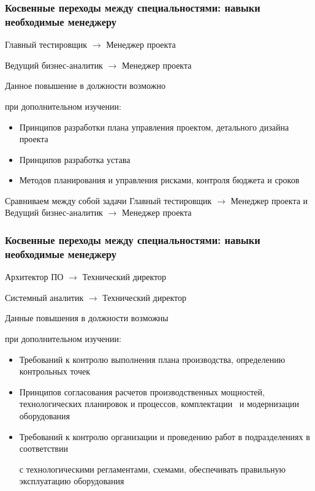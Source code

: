 \documentclass{../industrial-development}
\begin{document}
\begin{frame} \frametitle{Косвенные переходы между специальностями: навыки необходимые менеджеру}

\begin{block}{Главный тестировщик $\rightarrow$ Менеджер проекта 

 Ведущий бизнес-аналитик $\rightarrow$ Менеджер проекта}

Данное повышение в должности возможно  

при дополнительном изучении:
  \end{block}
  \begin{itemize}
  \item Принципов разработки плана управления проектом, детального дизайна проекта
  \item Принципов разработка устава
 \item Методов планирования и управления рисками, контроля бюджета и сроков
  \end{itemize}
\end{frame}

\lecturenotes

Сравниваем между собой задачи Главный тестировщик $\rightarrow$ Менеджер проекта и
 Ведущий бизнес-аналитик $\rightarrow$ Менеджер проекта


\begin{frame} \frametitle{Косвенные переходы между специальностями: навыки необходимые менеджеру}

\begin{block}{Архитектор ПО  $\rightarrow$ Технический директор  

Системный аналитик $\rightarrow$ Технический директор }

Данные повышения в должности возможны 

при дополнительном изучении:
  \end{block}
  \begin{itemize}
  \item Требований к контролю выполнения плана производства, определению контрольных точек
  \item Принципов согласования расчетов производственных мощностей, технологических планировок и  процессов, комплектации ~и модернизации оборудования 
  \item Требований к контролю организации и проведению работ в  подразделениях в соответствии 

с технологическими регламентами, схемами, обеспечивать правильную эксплуатацию оборудования 
  \end{itemize}
\end{frame}
\end{document}
